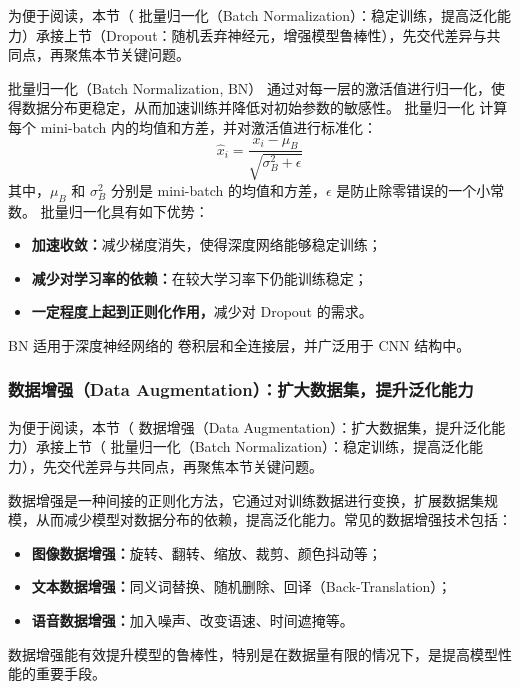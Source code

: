 
为便于阅读，本节（ 批量归一化（Batch Normalization）：稳定训练，提高泛化能力）承接上节（Dropout：随机丢弃神经元，增强模型鲁棒性），先交代差异与共同点，再聚焦本节关键问题。

批量归一化（Batch Normalization, BN） 通过对每一层的激活值进行归一化，使得数据分布更稳定，从而加速训练并降低对初始参数的敏感性。
批量归一化 计算每个 mini-batch 内的均值和方差，并对激活值进行标准化：
  \[
  \hat{x}_i = \frac{x_i - \mu_B}{\sqrt{\sigma_B^2 + \epsilon}}
  \]
  其中，\(\mu_B\) 和 \(\sigma_B^2\) 分别是 mini-batch 的均值和方差，\(\epsilon\) 是防止除零错误的一个小常数。
批量归一化具有如下优势：
\begin{itemize}
\item {\bf   加速收敛：}减少梯度消失，使得深度网络能够稳定训练；
\item {\bf  减少对学习率的依赖：}在较大学习率下仍能训练稳定；


 \item {\bf  一定程度上起到正则化作用，}减少对 Dropout 的需求。
\end{itemize}
BN 适用于深度神经网络的 卷积层和全连接层，并广泛用于 CNN 结构中。
\subsubsection*{ 数据增强（Data Augmentation）：扩大数据集，提升泛化能力}


为便于阅读，本节（ 数据增强（Data Augmentation）：扩大数据集，提升泛化能力）承接上节（ 批量归一化（Batch Normalization）：稳定训练，提高泛化能力），先交代差异与共同点，再聚焦本节关键问题。

数据增强是一种间接的正则化方法，它通过对训练数据进行变换，扩展数据集规模，从而减少模型对数据分布的依赖，提高泛化能力。常见的数据增强技术包括：
\begin{itemize}
\item {\bf  图像数据增强：}旋转、翻转、缩放、裁剪、颜色抖动等；
\item {\bf  文本数据增强：}同义词替换、随机删除、回译（Back-Translation）；
\item {\bf  语音数据增强：}加入噪声、改变语速、时间遮掩等。
\end{itemize}
数据增强能有效提升模型的鲁棒性，特别是在数据量有限的情况下，是提高模型性能的重要手段。

